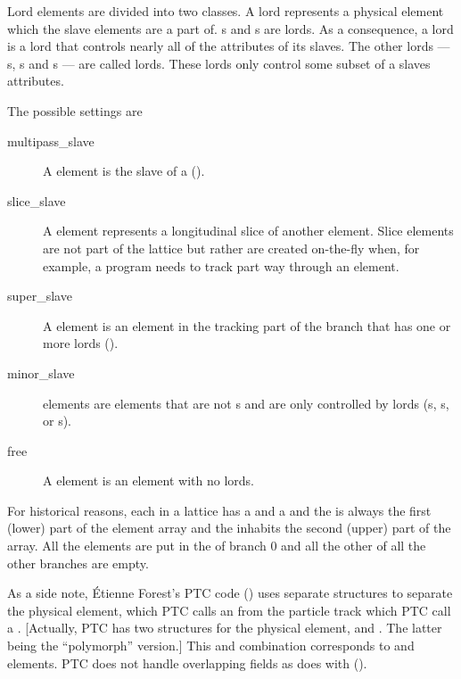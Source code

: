 Lord elements are divided into two classes.  A  lord represents a physical element which
the slave elements are a part of.  s and s are  lords.
As a consequence, a  lord is a lord that controls nearly all of the attributes of its
slaves.  The other lords --- s, s and s --- are
called  lords.  These lords only control some subset of a slaves attributes.

The possible  settings are
  \begin{description}
  \item[multipass_slave]\Newline
A  element is the slave of a 
().
  \item[slice_slave]\Newline
A  element represents a longitudinal slice of another element.
Slice elements are not part of the lattice but rather are created on-the-fly
when, for example, a program needs to track part way through an element.
  \item[super_slave]\Newline 
A  element is an element in the tracking part of the branch that 
has one or more  lords ().
  \item[minor_slave]\Newline
{} elements are elements that are not s and are only controlled
by  lords (s, s, or s).
  \item[free]\Newline
A  element is an element with no lords.
  \end{description}

For historical reasons, each  in a lattice has a  and a  and the  is always the first (lower) part of the element array and the
 inhabits the second (upper) part of the array.  All the  elements are put
in the  of branch 0 and all the other  of all the other branches
are empty.

As a side note, \'Etienne Forest's PTC code () uses separate structures to
separate the physical element, which PTC calls an  from the particle track which PTC
call a .  [Actually, PTC has two structures for the physical element,  and
. The latter being the ``polymorph'' version.] This  and 
combination corresponds to \bmad {} and  elements. PTC does not
handle overlapping fields as \bmad does with  ().

